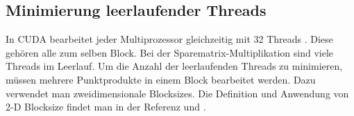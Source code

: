 \subsection{Minimierung leerlaufender Threads}

In CUDA bearbeitet jeder Multiprozessor gleichzeitig mit 32 Threads \cite{cudapg}.
Diese gehören alle zum selben Block.
Bei der Sparematrix-Multiplikation sind viele Threads im Leerlauf.
Um die Anzahl der leerlaufenden Threads zu minimieren,
müssen mehrere Punktprodukte in einem Block bearbeitet werden.
Dazu verwendet man zweidimensionale Blocksizes.
Die Definition und Anwendung von 2-D Blocksize findet man in der Referenz\cite{cudapg} und \cite{cudbp}.

